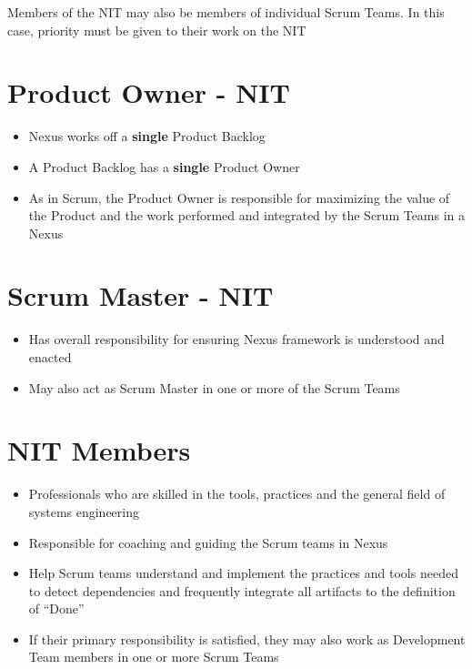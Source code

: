 \documentclass[a4paper,11pt,twocolumn]{article}
\begin{document}
\begin{tcolorbox}[colback=black!8!white,colframe=gray!50!black,title=Note,sharp corners,fonttitle=\normalsize\bfseries,fontupper=\normalsize]
	Members of the NIT may also be members of individual Scrum Teams. In this case, priority must be given to their work on the NIT
\end{tcolorbox}

\section*{Product Owner - NIT}
\begin{itemize}
	\item Nexus works off a \textbf{single} Product Backlog
	\item A Product Backlog has a \textbf{single} Product Owner
	\item As in Scrum, the Product Owner is responsible for maximizing the value of the Product and the work performed and integrated by the Scrum Teams in a Nexus
\end{itemize}

\section*{Scrum Master - NIT}
\begin{itemize}
	\item Has overall responsibility for ensuring Nexus framework is understood and enacted
	\item May also act as Scrum Master in one or more of the Scrum Teams
\end{itemize}

\section*{NIT Members}
\begin{itemize}
    \item Professionals who are skilled in the tools, practices and the general field of systems engineering
	\item Responsible for coaching and guiding the Scrum teams in Nexus
	\item Help Scrum teams understand and implement the practices and tools needed to detect dependencies and frequently integrate all artifacts to the definition of ``Done''
	\item If their primary responsibility is satisfied, they may also work as Development Team members in one or more Scrum Teams
\end{itemize}
\end{document}
